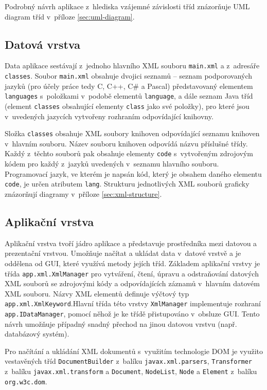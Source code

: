 \documentclass[czech,BP]{thesiskiv}
\begin{document}
\noindent
Podrobný návrh aplikace z~hlediska vzájemné závislosti tříd znázorňuje UML diagram tříd v~příloze \ref{sec:uml-diagram}.

\subsection{Datová vrstva}
Data aplikace sestávají z~jednoho hlavního XML souboru \texttt{main.xml} a z~adresáře \texttt{classes}. Soubor \texttt{main.xml} obsahuje dvojici seznamů -- seznam podporovaných jazyků (pro účely práce tedy C, C++, C\# a Pascal) představovaný elementem \texttt{languages} s~položkami v~podobě elementů \texttt{language}, a dále seznam Java tříd (element \texttt{classes} obsahující elementy \texttt{class} jako své položky), pro které jsou v~uvedených jazycích vytvořeny rozhraním odpovídající knihovny.\par
Složka \texttt{classes} obsahuje XML soubory knihoven odpovídající seznamu knihoven v~hlavním souboru. Název souboru knihoven odpovídá názvu příslušné třídy. Každý z~těchto souborů pak obsahuje elementy \texttt{code} s~vytvořeným zdrojovým kódem pro každý z~jazyků uvedených v~seznamu hlavního souboru. Programovací jazyk, ve kterém je napsán kód, který je obsahem daného elementu \texttt{code}, je určen atributem \texttt{lang}. Strukturu jednotlivých XML souborů graficky znázorňují diagramy v~příloze \ref{sec:xml-structure}.

\subsection{Aplikační vrstva}
Aplikační vrstva tvoří jádro aplikace a představuje prostředníka mezi datovou a prezentační vrstvou. Umožňuje načítat a ukládat data v~datové vrstvě a je oddělena od GUI, které využívá metody jejích tříd. Základem aplikační vrstvy je třída \texttt{app.xml.Xml\-Manager} pro vytváření, čtení, úpravu a odstraňování datových XML souborů se zdrojovými kódy a odpovídajících záznamů v~hlavním datovém XML souboru. Názvy XML elementů definuje výčtový typ \texttt{app.xml.XmlKeyword}.Hlavní třída této vrstvy \texttt{XmlManager} implementuje rozhraní \texttt{app.IDataManager}, pomocí něhož je ke třídě přistupováno v~obsluze GUI. Tento návrh umožňuje případný snadný přechod na jinou datovou vrstvu (např. databázový systém).\par
Pro načítání a ukládání XML dokumentů s~využitím technologie DOM je využito vestavěných tříd \texttt{DocumentBuilder} z~balíku \texttt{javax.xml.parsers}, \texttt{Transformer} z~balíku \texttt{javax.xml.transform} a \texttt{Document}, \texttt{NodeList}, \texttt{Node} a \texttt{Element} z~balíku \texttt{org.w3c.dom}.
\end{document}
